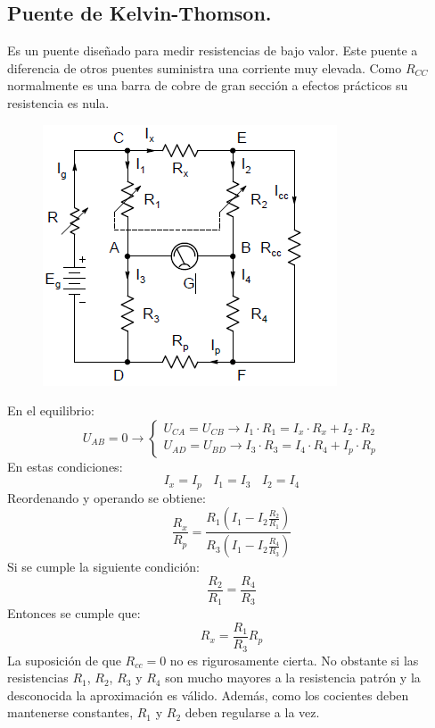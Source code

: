 \subsection{Puente de Kelvin-Thomson.}
Es un puente diseñado para medir resistencias de bajo valor. Este puente a diferencia de otros puentes suministra una corriente muy elevada. Como $R_{CC}$ normalmente es una barra de cobre de gran sección a efectos prácticos su resistencia es nula.
\begin{figure}[H]
	\centering
	\includegraphics[width=0.5\linewidth]{ImagenesTema4/14}
	\label{fig:14}
\end{figure}
En el equilibrio:
\[U_{AB}=0\rightarrow \left\{ \begin{matrix}
	U_{CA} = U_{CB} \rightarrow I_1 \cdot R_1=I_x \cdot R_x+I_2\cdot R_2\\
	U_{AD}= U_{BD} \rightarrow I_3 \cdot R_3=I_4 \cdot R_4+I_p\cdot R_p
\end{matrix}\right.\]
En estas condiciones:
\[I_x=I_p \ \ \ \ I_1=I_3 \ \ \ \ I_2=I_4\]
Reordenando y operando se obtiene:
\[\frac{R_x}{R_p}=\frac{R_1\left(I_1  -I_2 \frac{R_2}{R_1}\right)  }{R_3\left(I_1  -I_2 \frac{R_4}{R_3}\right)}\]
Si se cumple la siguiente condición:
\[\frac{R_2}{R_1}=\frac{R_4}{R_3}\]
Entonces se cumple que:
\[R_x=\frac{R_1}{R_3}R_p\]
La suposición de que $R_{cc}=0$ no es rigurosamente cierta. No obstante si las resistencias $R_1$, $R_2$, $R_3$ y $R_4$ son mucho mayores a la resistencia patrón y la desconocida la aproximación es válido. Además, como los cocientes deben mantenerse constantes, $R_1$ y $R_2$ deben regularse a la vez.